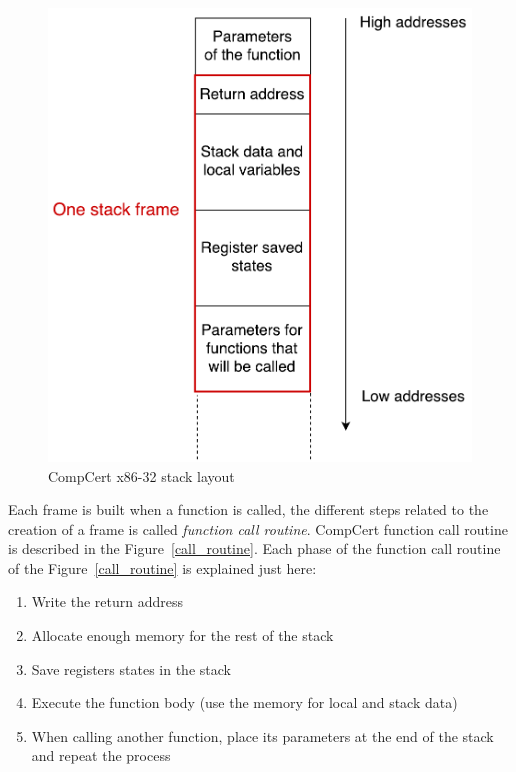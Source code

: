 \documentclass[11pt]{sdm}
\begin{document}
\begin{figure}
\centering
\includegraphics[scale=0.55]{images/stack_layout.pdf}
\caption{CompCert x86-32 stack layout}
\label{stack_layout}
\end{figure}

Each frame is built when a function is called, the different steps related to the creation of a frame is called \textit{function call routine}.
CompCert function call routine is described in the Figure~\ref{call_routine}. Each phase of the function call routine of the Figure~\ref{call_routine} is explained just here:
\begin{enumerate}
	\item Write the return address
	\item Allocate enough memory for the rest of the stack
	\item Save registers states in the stack
	\item Execute the function body (use the memory for local and stack data)
	\item When calling another function, place its parameters at the end of the stack and repeat the process
\end{enumerate}
\end{document}
